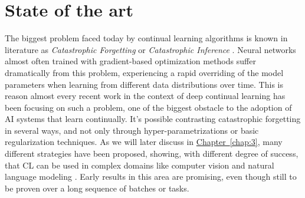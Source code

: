 \documentclass[english, LaM, oneside]{sapthesis}%
\begin{document}
\section{State of the art}

The biggest problem faced today by continual learning algorithms is known in literature as \textit{Catastrophic Forgetting} or \textit{Catastrophic Inference} \cite{cat_forgetting}. Neural networks almost often trained with gradient-based optimization methods suffer dramatically from this problem, experiencing a rapid overriding of the model parameters when learning from different data distributions over time. This is reason almost every recent work in the context of deep continual learning has been focusing on such a problem, one of the biggest obstacle to the adoption of AI systems that learn continually.
It's possible contrasting catastrophic forgetting in several ways, and not only through hyper-parametrizations or basic regularization techniques. As we will later discuss in \hyperref[chap:3]{Chapter~\ref*{chap:3}}, many different strategies have been proposed, showing, with different degree of success, that CL can be used in complex domains like computer vision and natural language modeling \cite{parisi}. Early results in this area are promising, even though still to be proven over a long sequence of batches or tasks.
\end{document}
